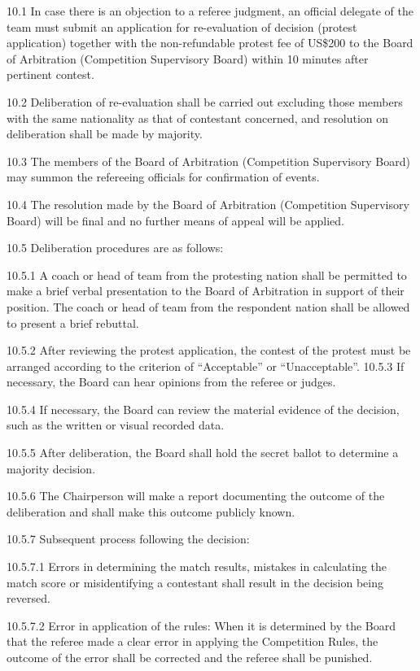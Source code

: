 \documentclass[draft]{report}
\begin{document}
10.1 In case there is an objection to a referee judgment, an official
delegate of the team must submit an application for re-evaluation of
decision (protest application) together with the non-refundable protest
fee of US\$200 to the Board of Arbitration (Competition Supervisory
Board) within 10 minutes after pertinent contest.

10.2 Deliberation of re-evaluation shall be carried out excluding those
members with the same nationality as that of contestant concerned, and
resolution on deliberation shall be made by majority.

10.3 The members of the Board of Arbitration (Competition Supervisory
Board) may summon the refereeing officials for confirmation of events.

10.4 The resolution made by the Board of Arbitration (Competition
Supervisory Board) will be final and no further means of appeal will be
applied.

10.5 Deliberation procedures are as follows:

10.5.1 A coach or head of team from the protesting nation shall be
permitted to make a brief verbal presentation to the Board of
Arbitration in support of their position. The coach or head of team from
the respondent nation shall be allowed to present a brief rebuttal.

10.5.2 After reviewing the protest application, the contest of the
protest must be arranged according to the criterion of ``Acceptable'' or
``Unacceptable''. 10.5.3 If necessary, the Board can hear opinions from
the referee or judges.

10.5.4 If necessary, the Board can review the material evidence of the
decision, such as the written or visual recorded data.

10.5.5 After deliberation, the Board shall hold the secret ballot to
determine a majority decision.

10.5.6 The Chairperson will make a report documenting the outcome of the
deliberation and shall make this outcome publicly known.

10.5.7 Subsequent process following the decision:

10.5.7.1 Errors in determining the match results, mistakes in
calculating the match score or misidentifying a contestant shall result
in the decision being reversed.

10.5.7.2 Error in application of the rules: When it is determined by the
Board that the referee made a clear error in applying the Competition
Rules, the outcome of the error shall be corrected and the referee shall
be punished.
\end{document}
